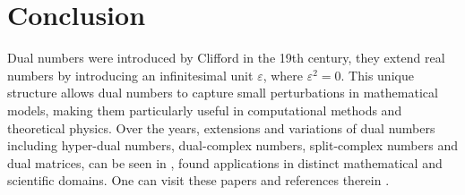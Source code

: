 \documentclass[11pt,a4paper,fleqn]{article}
\numberwithin{equation}{section}
\numberwithin{lemma}{section}
\numberwithin{theorem}{section}
\numberwithin{corollary}{section}
\begin{document}
\section{Conclusion}
Dual numbers were introduced by Clifford in the 19th century, they extend real numbers by introducing an infinitesimal unit $\varepsilon$, where $\varepsilon^2 = 0$. This unique structure allows dual numbers to capture small perturbations in mathematical models, making them particularly useful in computational methods and theoretical physics. Over the years, extensions and variations of dual numbers including hyper-dual numbers, dual-complex numbers,  split-complex numbers and dual matrices, can be seen in \cite{cwk,pvd,vmt}, found applications in distinct mathematical and scientific domains. One can visit these papers and references therein \cite{ar,ja,wb,cs15,cs17,dhhk,drh,fa,isf,gw,msc,ovr,pvfa,pv,pvd,eac,rb,reaw,vt,yi}.
\end{document}
